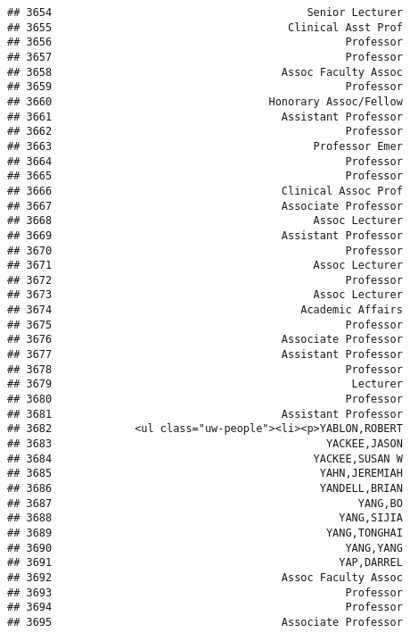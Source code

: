 \documentclass[
]{article}
\begin{document}
\begin{verbatim}
## 3654                                        Senior Lecturer
## 3655                                     Clinical Asst Prof
## 3656                                              Professor
## 3657                                              Professor
## 3658                                    Assoc Faculty Assoc
## 3659                                              Professor
## 3660                                  Honorary Assoc/Fellow
## 3661                                    Assistant Professor
## 3662                                              Professor
## 3663                                         Professor Emer
## 3664                                              Professor
## 3665                                              Professor
## 3666                                    Clinical Assoc Prof
## 3667                                    Associate Professor
## 3668                                         Assoc Lecturer
## 3669                                    Assistant Professor
## 3670                                              Professor
## 3671                                         Assoc Lecturer
## 3672                                              Professor
## 3673                                         Assoc Lecturer
## 3674                                       Academic Affairs
## 3675                                              Professor
## 3676                                    Associate Professor
## 3677                                    Assistant Professor
## 3678                                              Professor
## 3679                                               Lecturer
## 3680                                              Professor
## 3681                                    Assistant Professor
## 3682             <ul class="uw-people"><li><p>YABLON,ROBERT
## 3683                                           YACKEE,JASON
## 3684                                         YACKEE,SUSAN W
## 3685                                          YAHN,JEREMIAH
## 3686                                          YANDELL,BRIAN
## 3687                                                YANG,BO
## 3688                                             YANG,SIJIA
## 3689                                           YANG,TONGHAI
## 3690                                              YANG,YANG
## 3691                                             YAP,DARREL
## 3692                                    Assoc Faculty Assoc
## 3693                                              Professor
## 3694                                              Professor
## 3695                                    Associate Professor

\end{verbatim}
\end{document}
